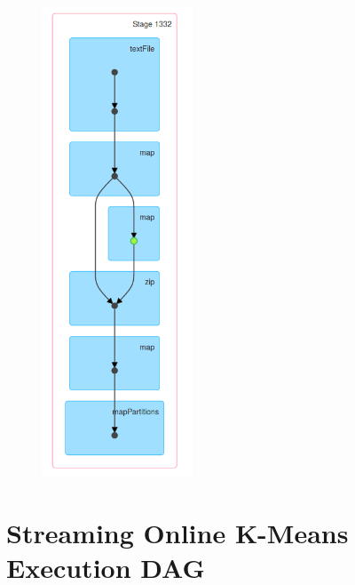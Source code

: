 \documentclass{l4proj}
\begin{document}
\begin{appendices}
\begin{figure}[H]
	\centering
    \label{fig:dag5}
    \includegraphics[width=0.40\textwidth]{images/DAG5}
\end{figure}

\section{Streaming Online K-Means Execution DAG}


\end{appendices}
\end{document}
